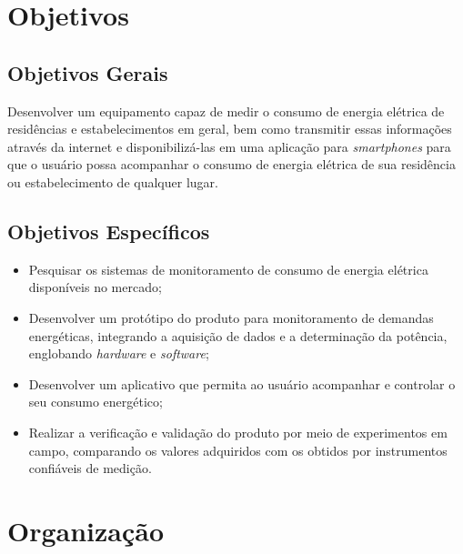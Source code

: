 \section{Objetivos}\label{sec:objetivos}
\subsection{Objetivos Gerais}\label{sec:objetivos_gerais}
Desenvolver um equipamento capaz de medir o consumo de energia elétrica de residências e estabelecimentos em geral, bem como transmitir essas informações através da internet e disponibilizá-las em uma aplicação para \textit{smartphones} para que o usuário possa acompanhar o consumo de energia elétrica de sua residência ou estabelecimento de qualquer lugar.

\subsection{Objetivos Específicos}\label{sec:objetivos_especificos}

\begin{itemize}
	\item Pesquisar os sistemas de monitoramento de consumo de energia elétrica disponíveis no mercado;
	\item Desenvolver um protótipo do produto para monitoramento de demandas energéticas, integrando a aquisição de dados e a determinação da potência, englobando \textit{hardware} e \textit{software};
    \item Desenvolver um aplicativo que permita ao usuário acompanhar e controlar o seu consumo energético;
    \item Realizar a verificação e validação do produto por meio de experimentos em campo, comparando os valores adquiridos com os obtidos por instrumentos confiáveis de medição.
\end{itemize}

\section{Organização}\label{sec:organização}

